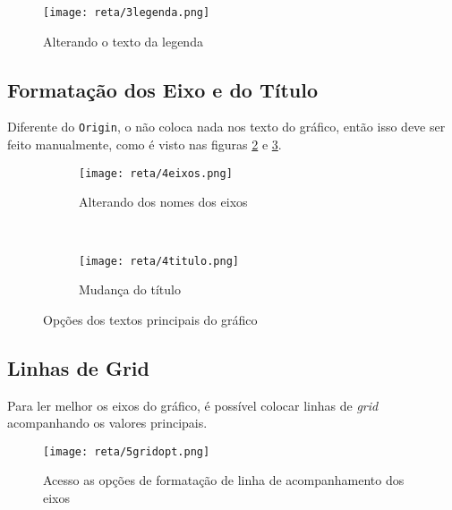     \begin{figure}[htbp]
        \centering
        \texttt{[image: reta/3legenda.png]}

        \caption{Alterando o texto da legenda}
        \label{fig:reta:legenda}
    \end{figure}


\subsection{Formatação dos Eixo e do Título}

    Diferente do \texttt{Origin}, o \software não coloca nada nos texto do gráfico, então isso deve ser feito manualmente, como é visto nas figuras \ref{fig:reta:eixo} e \ref{fig:reta:titulo}.

    \begin{figure}[htbp]
        \centering
        \begin{subfigure}{0.45\textwidth}
            \centering
            \texttt{[image: reta/4eixos.png]}

            \caption{Alterando dos nomes dos eixos}
            \label{fig:reta:eixo}
        \end{subfigure}
        ~
        \begin{subfigure}{0.45\textwidth}
            \centering
            \texttt{[image: reta/4titulo.png]}

            \caption{Mudança do título}
            \label{fig:reta:titulo}
        \end{subfigure}
        \caption{Opções dos textos principais do gráfico}
        \label{fig:reta:textos}
    \end{figure}


\subsection{Linhas de Grid}

    Para ler melhor os eixos do gráfico, é possível colocar linhas de \textit{grid} acompanhando os valores principais.

    \begin{figure}[htbp]
        \centering
        \texttt{[image: reta/5gridopt.png]}

        \caption{Acesso as opções de formatação de linha de acompanhamento dos eixos}
        \label{fig:reta:gridopt}
    \end{figure}

